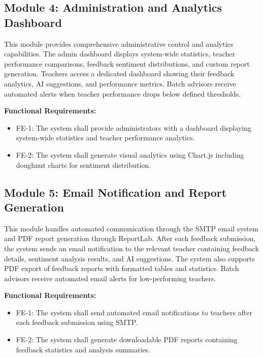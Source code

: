 \subsection{Module 4: Administration and Analytics Dashboard}

This module provides comprehensive administrative control and analytics capabilities. The admin dashboard displays system-wide statistics, teacher performance comparisons, feedback sentiment distributions, and custom report generation. Teachers access a dedicated dashboard showing their feedback analytics, AI suggestions, and performance metrics. Batch advisors receive automated alerts when teacher performance drops below defined thresholds.

\textbf{Functional Requirements:}

\begin{itemize}
    \item FE-1: The system shall provide administrators with a dashboard displaying system-wide statistics and teacher performance analytics.
    \item FE-2: The system shall generate visual analytics using Chart.js including doughnut charts for sentiment distribution.
\end{itemize}



\subsection{Module 5: Email Notification and Report Generation}

This module handles automated communication through the SMTP email system and PDF report generation through ReportLab. After each feedback submission, the system sends an email notification to the relevant teacher containing feedback details, sentiment analysis results, and AI suggestions. The system also supports PDF export of feedback reports with formatted tables and statistics. Batch advisors receive automated email alerts for low-performing teachers.

\textbf{Functional Requirements:}

\begin{itemize}
    \item FE-1: The system shall send automated email notifications to teachers after each feedback submission using SMTP.
    \item FE-2: The system shall generate downloadable PDF reports containing feedback statistics and analysis summaries.
\end{itemize}


